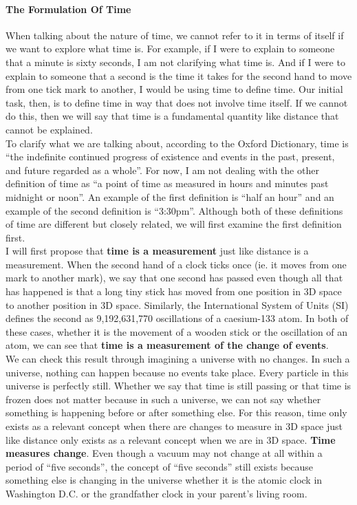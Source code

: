 \documentclass[a4paper, 12pt]{article}
\begin{document}
\paragraph{The Formulation Of Time}
When talking about the nature of time, we cannot refer to it in terms of itself if we want to explore what time is. For example, if I were to explain to someone that a minute is sixty seconds, I am not clarifying what time is. And if I were to explain to someone that a second is the time it takes for the second hand to move from one tick mark to another, I would be using time to define time. Our initial task, then, is to define time in way that does not involve time itself. If we cannot do this, then we will say that time is a fundamental quantity like distance that cannot be explained. \\
\break
To clarify what we are talking about, according to the Oxford Dictionary, time is ``the indefinite continued progress of existence and events in the past, present, and future regarded as a whole''. For now, I am not dealing with the other definition of time as ``a point of time as measured in hours and minutes past midnight or noon''. An example of the first definition is ``half an hour'' and an example of the second definition is ``3:30pm''. Although both of these definitions of time are different but closely related, we will first examine the first definition first. \\
\breaks
I will first propose that \textbf{time is a measurement} just like distance is a measurement. When the second hand of a clock ticks once (ie. it moves from one mark to another mark), we say that one second has passed even though all that has happened is that a long tiny stick has moved from one position in 3D space to another position in 3D space. Similarly, the International System of Units (SI) defines the second as 9,192,631,770 oscillations of a caesium-133 atom. In both of these cases, whether it is the movement of a wooden stick or the oscillation of an atom, we can see that \textbf{time is a measurement of the change of events}. \\
\break
We can check this result through imagining a universe with no changes. In such a universe, nothing can happen because no events take place. Every particle in this universe is perfectly still. Whether we say that time is still passing or that time is frozen does not matter because in such a universe, we can not say whether something is happening before or after something else. For this reason, time only exists as a relevant concept when there are changes to measure in 3D space just like distance only exists as a relevant concept when we are in 3D space. \textbf{Time measures change}. Even though a vacuum may not change at all within a period of ``five seconds'', the concept of ``five seconds'' still exists because something else is changing in the universe whether it is the atomic clock in Washington D.C. or the grandfather clock in your parent's living room. \\
\end{document}
